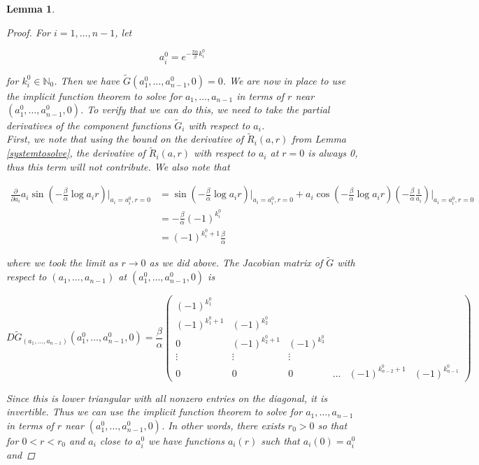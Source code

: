 \documentclass[12pt]{article}
\def\N{{\mathbb N}}
\newtheorem{lemma}{Lemma}
\begin{document}
\begin{lemma}
\begin{proof}
For $i = 1, \dots, n-1$, let

\begin{equation}
a_i^0 = e^{-\frac{\pi \alpha}{\beta} k_i^0 }
\end{equation}

for $k_i^0 \in \N_0$. Then we have $\tilde{G}(a_1^0, \dots, a_{n-1}^0, 0) = 0$. We are now in place to use the implicit function theorem to solve for $a_1, \dots, a_{n-1}$ in terms of $r$ near $(a_1^0, \dots, a_{n-1}^0, 0)$. To verify that we can do this, we need to take the partial derivatives of the component functions $\tilde{G}_i$ with respect to $a_i$.\\ 

First, we note that using the bound on the derivative of $\tilde{R}_i(a, r)$ from Lemma \ref{systemtosolve}, the derivative of $\tilde{R}_i(a, r)$ with respect to $a_i$ at $r = 0$ is always 0, thus this term will not contribute. We also note that

\begin{align*}
\frac{\partial}{\partial a_i} a_i \sin \left( - \frac{\beta}{\alpha} \log a_i r \right)\Big|_{a_i = a_i^0, r = 0}
&= \sin \left( - \frac{\beta}{\alpha} \log a_i r \right)\Big|_{a_i = a_i^0, r = 0} + a_i \cos \left( - \frac{\beta}{\alpha} \log a_i r \right)\left( -\frac{\beta}{\alpha} \frac{1}{a_i} \right) \Big|_{a_i = a_i^0, r = 0}\\
&= -\frac{\beta}{\alpha}(-1)^{k_i^0} \\
&= (-1)^{k_i^0 + 1}\frac{\beta}{\alpha}
\end{align*}

where we took the limit as $r \rightarrow 0$ as we did above. The Jacobian matrix of $\tilde{G}$ with respect to $(a_1, \dots, a_{n-1})$ at $(a_1^0, \dots, a_{n-1}^0, 0)$ is 

\begin{equation}
D\tilde{G}_{(a_1, \dots, a_{n-1})}(a_1^0, \dots, a_{n-1}^0, 0) 
= \dfrac{\beta}{\alpha}
\begin{pmatrix}
(-1)^{k_1^0} & & & \\
(-1)^{k_1^0 + 1} & (-1)^{k_2^0} \\
0 & (-1)^{k_2^0 + 1} & (-1)^{k_3^0} \\
\vdots & \vdots & \vdots \\
0 & 0 & 0 & \dots & (-1)^{k_{n-2}^0 + 1} & (-1)^{k_{n-1}^0} 
\end{pmatrix}
\end{equation}

Since this is lower triangular with all nonzero entries on the diagonal, it is invertible. Thus we can use the implicit function theorem to solve for $a_1, \dots, a_{n-1}$ in terms of $r$ near $(a_1^0, \dots, a_{n-1}^0, 0)$. In other words, there exists $r_0 > 0$ so that for $0 < r < r_0$ and $a_i$ close to $a_i^0$ we have functions $a_i(r)$ such that $a_i(0) = a_i^0$ and 


\end{proof}
\end{lemma}
\end{document}
